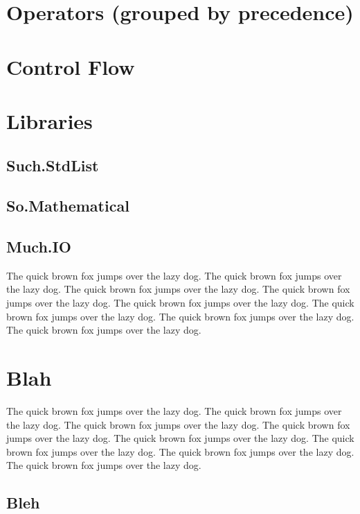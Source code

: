 \documentclass{refcard}
\begin{document}
\section{Operators (grouped by precedence)}

\section{Control Flow}

\section{Libraries}

\subsection{Such.StdList}

\subsection{So.Mathematical}

\subsection{Much.IO}

The quick brown fox jumps over the lazy dog.
The quick brown fox jumps over the lazy dog.
The quick brown fox jumps over the lazy dog.
The quick brown fox jumps over the lazy dog.
The quick brown fox jumps over the lazy dog.
The quick brown fox jumps over the lazy dog.
The quick brown fox jumps over the lazy dog.
The quick brown fox jumps over the lazy dog.

\section{Blah}

The quick brown fox jumps over the lazy dog.
The quick brown fox jumps over the lazy dog.
The quick brown fox jumps over the lazy dog.
The quick brown fox jumps over the lazy dog.
The quick brown fox jumps over the lazy dog.
The quick brown fox jumps over the lazy dog.
The quick brown fox jumps over the lazy dog.
The quick brown fox jumps over the lazy dog.

\subsection{Bleh}
\end{document}
